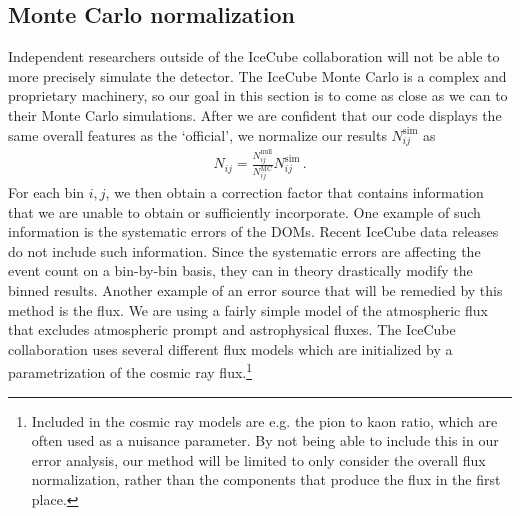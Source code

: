 \subsection*{Monte Carlo normalization}
Independent researchers outside of the IceCube collaboration will not be able to more precisely
simulate the detector. The IceCube Monte Carlo is a complex and proprietary machinery, so our goal in this 
section is to come as close as we can to their Monte Carlo simulations. After we are confident that 
our code displays the same overall features as the `official', we normalize our results $N_{ij}^\text{sim}$ as 
\begin{align}\label{eq:MC_norm}
    N_{ij} = \frac{N_{ij}^\text{null}}{N_{ij}^\text{MC}} N_{ij}^\text{sim}\,.
\end{align}
For each bin $i,j$, we then obtain a correction factor that contains information that we are unable
to obtain or sufficiently incorporate. One example of such information is the systematic errors of the DOMs.
Recent IceCube data releases do not include such information. Since the systematic errors are affecting the 
event count on a bin-by-bin basis, they can in theory drastically modify the binned results. Another example of
an error source that will be remedied by this method is the flux. We are using a fairly simple model of the atmospheric 
flux that excludes atmospheric prompt and astrophysical fluxes. The IceCube collaboration uses several different flux models which are initialized 
by a parametrization of the cosmic ray flux.\footnote{Included in the cosmic ray models are e.g. the pion to kaon 
ratio, which are often used as a nuisance parameter. By not being able to include this in our error analysis, our method will 
be limited to only consider the overall flux normalization, rather than the components that produce the flux in the first place.}

